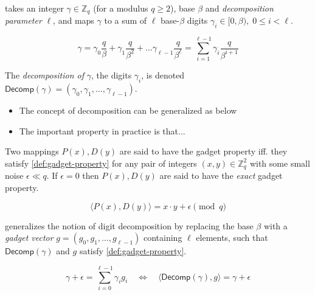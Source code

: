 \begin{definition}
    takes an integer $\gamma\in\mathbb{Z}_q$ (for a modulus $q\geq 2$), base $\beta$ and \textit{decomposition parameter} $\ell$, and maps $\gamma$ to a sum of $\ell$ base-$\beta$ digits $\gamma_i \in [0, \beta),\; 0 \leq i < \ell$.  
    
    \begin{equation}
        \gamma = \gamma_0\frac{q}{\beta} + \gamma_1\frac{q}{\beta^2} + ... \gamma_{\ell - 1}\frac{q}{\beta^{\ell}} = \sum_{i=1}^{\ell-1}\gamma_i\frac{q}{\beta^{i+1}}
    \end{equation}

    The \textit{decomposition of} $\mathit{\gamma}$, the digits $\gamma_i$, is denoted $\mathsf{Decomp}(\gamma) = (\gamma_0, \gamma_1, \dots, \gamma_{\ell-1})$.
\end{definition}

\begin{itemize}
    \item The concept of decomposition can be generalized as below
    \item The important property in practice is that...
\end{itemize}

\begin{definition}
    Two mappings $P(x), D(y)$ are said to have the gadget property iff. they satisfy \eqref{def:gadget-property} for any pair of integers $(x, y) \in \mathbb{Z}_q^2$ with some small noise $\epsilon \ll q$. If $\epsilon = 0$ then $P(x), D(y)$ are said to have the \textit{exact} gadget property.

    \begin{equation}
        \label{def:gadget-property}
        \langle P(x), D(y)\rangle = x\cdot y + \epsilon \pmod{q}
    \end{equation}
\end{definition}

\begin{definition}
    generalizes the notion of digit decomposition by replacing the base $\beta$ with a \textit{gadget vector} $g = (g_0, g_1, \dots, g_{\ell-1})$ containing $\ell$ elements, such that $\mathsf{Decomp}(\gamma)$ and $g$ satisfy \eqref{def:gadget-property}.
    
    \begin{equation*}
        \label{def:gadget-decomp}
        \gamma + \epsilon = \sum_{i=0}^{\ell - 1} \gamma_i g_i \quad\iff\quad \langle \mathsf{Decomp}(\gamma), g\rangle = \gamma + \epsilon
    \end{equation*}
\end{definition}

